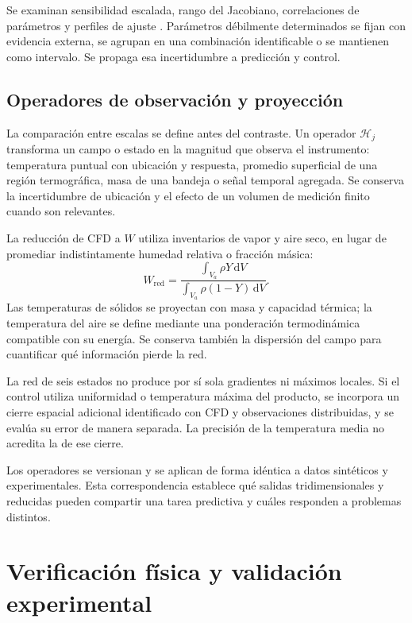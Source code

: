 Se examinan sensibilidad escalada, rango del Jacobiano, correlaciones de parámetros y perfiles de ajuste \cite{ljung1999}. Parámetros débilmente determinados se fijan con evidencia externa, se agrupan en una combinación identificable o se mantienen como intervalo. Se propaga esa incertidumbre a predicción y control.

\subsection{Operadores de observación y proyección}
\label{met:operadores}

La comparación entre escalas se define antes del contraste. Un operador $\mathcal H_j$ transforma un campo o estado en la magnitud que observa el instrumento: temperatura puntual con ubicación y respuesta, promedio superficial de una región termográfica, masa de una bandeja o señal temporal agregada. Se conserva la incertidumbre de ubicación y el efecto de un volumen de medición finito cuando son relevantes.

La reducción de CFD a $W$ utiliza inventarios de vapor y aire seco, en lugar de promediar indistintamente humedad relativa o fracción másica:
\begin{equation}
W_{\mathrm{red}}=
\frac{\int_{V_a}\rho Y\,\mathrm dV}
{\int_{V_a}\rho(1-Y)\,\mathrm dV}.
\label{met:proyeccion_W}
\end{equation}
Las temperaturas de sólidos se proyectan con masa y capacidad térmica; la temperatura del aire se define mediante una ponderación termodinámica compatible con su energía. Se conserva también la dispersión del campo para cuantificar qué información pierde la red.

La red de seis estados no produce por sí sola gradientes ni máximos locales. Si el control utiliza uniformidad o temperatura máxima del producto, se incorpora un cierre espacial adicional identificado con CFD y observaciones distribuidas, y se evalúa su error de manera separada. La precisión de la temperatura media no acredita la de ese cierre.

Los operadores se versionan y se aplican de forma idéntica a datos sintéticos y experimentales. Esta correspondencia establece qué salidas tridimensionales y reducidas pueden compartir una tarea predictiva y cuáles responden a problemas distintos.

\section{Verificación física y validación experimental}
\label{met:validacion}

